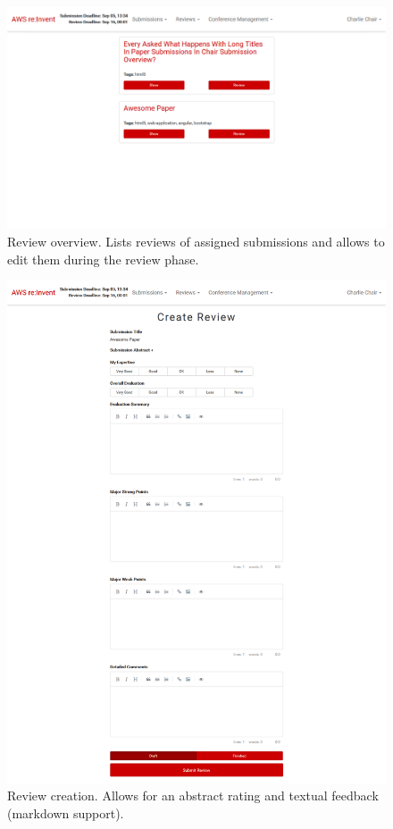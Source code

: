 \documentclass[nochapterpage,nopartpage,noheadingspace,numbersubsubsec,bigchapter,colorback,accentcolor=tud9c,10pt]{tudreport}
\begin{document}
        \begin{figure}[!ht]
            \centering
            \includegraphics[width=\textwidth]{img/ui-review-overview}
            \caption{Review overview. Lists reviews of assigned submissions and allows to edit them during the review phase.}
            \label{fig:appendix:screenshots:ui-review-overview}
        \end{figure}

        \begin{figure}[!ht]
            \centering
            \includegraphics[width=\textwidth]{img/ui-review-create}
            \caption{Review creation. Allows for an abstract rating and textual feedback (markdown support).}
            \label{fig:appendix:screenshots:ui-review-create}
        \end{figure}
\end{document}
